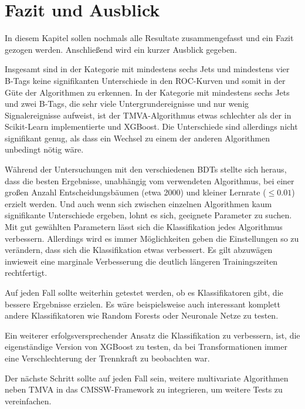
\chapter{Fazit und Ausblick}
\label{ch:Fazit}

{}

In diesem Kapitel sollen nochmals alle Resultate zusammengefasst und ein Fazit gezogen werden. Anschlie\ss end wird ein kurzer Ausblick gegeben.

Insgesamt sind in der Kategorie mit mindestens sechs Jets und mindestens vier B-Tags keine signifikanten Unterschiede in den ROC-Kurven und somit in der G\"ute der Algorithmen zu erkennen. In der Kategorie mit mindestens sechs Jets und zwei B-Tags, die sehr viele Untergrundereignisse und nur wenig Signalereignisse aufweist, ist der TMVA-Algorithmus etwas schlechter als der in Scikit-Learn implementierte und XGBoost. Die Unterschiede sind allerdings nicht signifikant genug, als dass ein Wechsel zu einem der anderen Algorithmen unbedingt n\"otig w\"are.

W\"ahrend der Untersuchungen mit den verschiedenen BDTs stellte sich heraus, dass die besten Ergebnisse, unabh\"angig vom verwendeten Algorithmus, bei einer gro\ss en Anzahl Entscheidungsb\"aumen (etwa 2000) und kleiner Lernrate ($\leq \num{0,01}$) erzielt werden. Und auch wenn sich zwischen einzelnen Algorithmen kaum signifikante Unterschiede ergeben, lohnt es sich, geeignete Parameter zu suchen. Mit gut gew\"ahlten Parametern l\"asst sich die Klassifikation jedes Algorithmus verbessern. Allerdings wird es immer M\"oglichkeiten geben die Einstellungen so zu ver\"andern, dass sich die Klassifikation etwas verbessert. Es gilt abzuw\"agen inwieweit eine marginale Verbesserung die deutlich l\"angeren Trainingszeiten rechtfertigt.

Auf jeden Fall sollte weiterhin getestet werden, ob es Klassifikatoren gibt, die bessere Ergebnisse erzielen. Es w\"are beispielsweise auch interessant komplett andere Klassifikatoren wie Random Forests oder Neuronale Netze zu testen.

Ein weiterer erfolgsversprechender Ansatz die Klassifikation zu verbessern, ist, die eigenst\"andige Version von XGBoost zu testen, da bei Transformationen immer eine Verschlechterung der Trennkraft zu beobachten war.

Der n\"achste Schritt sollte auf jeden Fall sein, weitere multivariate Algorithmen neben TMVA in das CMSSW-Framework zu integrieren, um weitere Tests zu vereinfachen.